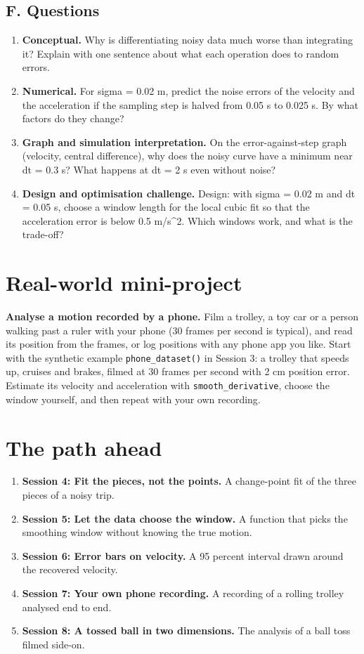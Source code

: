 \documentclass[11pt,a4paper]{article}
\begin{document}
\subsection*{F. Questions}
\begin{enumerate}[nosep]
\item \textbf{Conceptual.} Why is differentiating noisy data much worse than integrating it? Explain with one sentence about what each operation does to random errors.
\item \textbf{Numerical.} For sigma = 0.02 m, predict the noise errors of the velocity and the acceleration if the sampling step is halved from 0.05 s to 0.025 s. By what factors do they change?
\item \textbf{Graph and simulation interpretation.} On the error-against-step graph (velocity, central difference), why does the noisy curve have a minimum near dt = 0.3 s? What happens at dt = 2 s even without noise?
\item \textbf{Design and optimisation challenge.} Design: with sigma = 0.02 m and dt = 0.05 s, choose a window length for the local cubic fit so that the acceleration error is below 0.5 m/s\textasciicircum{}2. Which windows work, and what is the trade-off?
\end{enumerate}

\section{Real-world mini-project}
\textbf{Analyse a motion recorded by a phone.} Film a trolley, a toy car or a person walking past a ruler with your phone (30 frames per second is typical), and read its position from the frames, or log positions with any phone app you like. Start with the synthetic example \texttt{phone\_dataset()} in Session 3: a trolley that speeds up, cruises and brakes, filmed at 30 frames per second with 2 cm position error. Estimate its velocity and acceleration with \texttt{smooth\_derivative}, choose the window yourself, and then repeat with your own recording.

\section{The path ahead}
\begin{enumerate}[nosep]
\item \textbf{Session 4: Fit the pieces, not the points.} A change-point fit of the three pieces of a noisy trip.
\item \textbf{Session 5: Let the data choose the window.} A function that picks the smoothing window without knowing the true motion.
\item \textbf{Session 6: Error bars on velocity.} A 95 percent interval drawn around the recovered velocity.
\item \textbf{Session 7: Your own phone recording.} A recording of a rolling trolley analysed end to end.
\item \textbf{Session 8: A tossed ball in two dimensions.} The analysis of a ball toss filmed side-on.
\end{enumerate}
\end{document}
